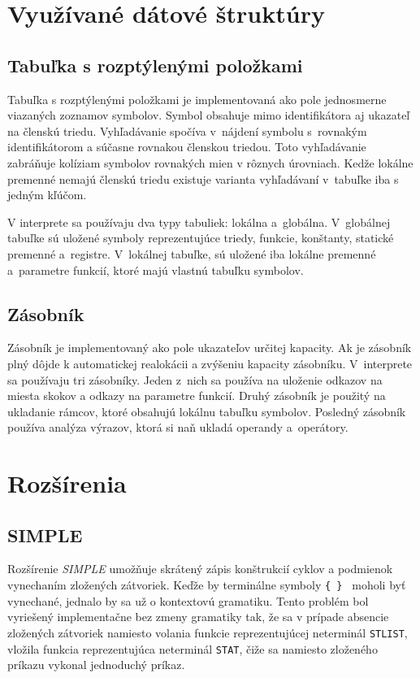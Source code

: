 \documentclass[11pt,a4paper]{article}
\begin{document}
	\section{Využívané dátové štruktúry}
	\label{struktury}

	\subsection{Tabuľka s rozptýlenými položkami}
	Tabuľka s rozptýlenými položkami je implementovaná ako pole jednosmerne
	viazaných zoznamov symbolov. Symbol obsahuje
	mimo identifikátora aj ukazateľ na členskú triedu. Vyhľadávanie spočíva
	v~nájdení symbolu s~rovnakým identifikátorom
	a súčasne rovnakou členskou triedou. Toto vyhľadávanie zabráňuje kolíziam
	symbolov rovnakých mien v rôznych úrovniach.
	Kedže lokálne premenné nemajú členskú triedu existuje varianta vyhľadávaní v~tabuľke
	iba s jedným kľúčom.

	V interprete sa používaju dva typy tabuliek: lokálna a~globálna. V~globálnej
	tabuľke sú uložené symboly reprezentujúce triedy, funkcie, konštanty, statické
	premenné a~registre. V~lokálnej tabuľke, sú uložené iba lokálne premenné a~parametre
	funkcií, ktoré majú vlastnú tabuľku symbolov.

	\subsection{Zásobník}
	Zásobník je implementovaný ako pole ukazateľov určitej kapacity. Ak je zásobník
	plný dôjde k automatickej realokácii a zvýšeniu kapacity zásobníku.
	V~interprete sa používaju tri zásobníky. Jeden z~nich sa používa na uloženie
	odkazov na miesta skokov a odkazy na parametre funkcií. Druhý zásobník je
	použitý na ukladanie rámcov, ktoré obsahujú lokálnu tabuľku symbolov.
    Posledný zásobník používa analýza výrazov, ktorá si naň ukladá operandy a~operátory.

	\section{Rozšírenia}
	\label{rozsirenia}

	\subsection{SIMPLE}
	Rozšírenie \emph{SIMPLE} umožňuje skrátený zápis konštrukcií cyklov a
	podmienok vynechaním zložených zátvoriek. Keďže by terminálne symboly
	\texttt{\{ \} } moholi byť vynechané, jednalo by sa už o kontextovú gramatiku.
	Tento problém bol vyriešený implementačne bez zmeny
	gramatiky tak, že sa v prípade absencie zložených zátvoriek namiesto volania
	funkcie reprezentujúcej neterminál \texttt{STLIST}, vložila
	funkcia reprezentujúca neterminál \texttt{STAT}, čiže sa namiesto zloženého
	príkazu vykonal jednoduchý príkaz.
\end{document}
